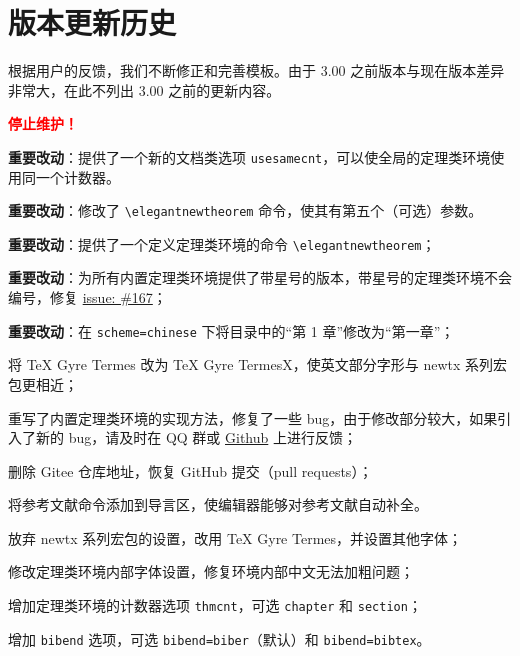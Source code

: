\documentclass[lang=cn,newtx,10pt,scheme=chinese]{elegantbook}
\begin{document}
\chapter{版本更新历史}

根据用户的反馈，我们不断修正和完善模板。由于 3.00 之前版本与现在版本差异非常大，在此不列出 3.00 之前的更新内容。

 \textcolor{red}{\bfseries 停止维护！}

\begin{change}
  \item \textbf{重要改动}：提供了一个新的文档类选项 \lstinline|usesamecnt|，可以使全局的定理类环境使用同一个计数器。
  \item \textbf{重要改动}：修改了 \lstinline|\elegantnewtheorem| 命令，使其有第五个（可选）参数。
\end{change}


\begin{change}
  \item \textbf{重要改动}：提供了一个定义定理类环境的命令 \lstinline|\elegantnewtheorem|；
  \item \textbf{重要改动}：为所有内置定理类环境提供了带星号的版本，带星号的定理类环境不会编号，修复 \href{https://github.com/ElegantLaTeX/ElegantBook/issues/167}{issue: \#167}；
  \item \textbf{重要改动}：在 \lstinline{scheme=chinese} 下将目录中的“第 1 章”修改为“第一章”；
  \item 将 TeX Gyre Termes 改为 TeX Gyre TermesX，使英文部分字形与 newtx 系列宏包更相近；
  \item 重写了内置定理类环境的实现方法，修复了一些 bug，由于修改部分较大，如果引入了新的 bug，请及时在 QQ 群或 \href{https://github.com/ElegantLaTeX}{Github} 上进行反馈；
  \item 删除 Gitee 仓库地址，恢复 GitHub 提交（pull requests）；
  \item 将参考文献命令添加到导言区，使编辑器能够对参考文献自动补全。
\end{change}


\begin{change}
  \item 放弃 newtx 系列宏包的设置，改用 TeX Gyre Termes，并设置其他字体；
  \item 修改定理类环境内部字体设置，修复环境内部中文无法加粗问题；
  \item 增加定理类环境的计数器选项 \lstinline{thmcnt}，可选 \lstinline{chapter} 和 \lstinline{section}；
  \item 增加 \lstinline{bibend} 选项，可选 \lstinline{bibend=biber}（默认）和 \lstinline{bibend=bibtex}。
\end{change}
\end{document}
